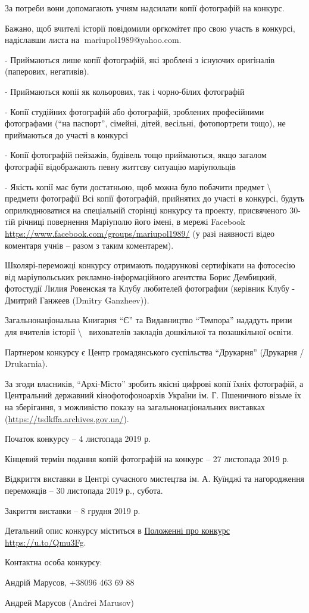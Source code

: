 За потреби вони допомагають учням надсилати копії фотографій на конкурс.

Бажано, щоб вчителі історії повідомили оргкомітет про свою участь в конкурсі,
надіславши листа на 📧mariupol1989@yahoo.com.

- Приймаються лише копії фотографій, які зроблені з існуючих оригіналів (паперових, негативів).

- Приймаються копії як кольорових, так і чорно-білих фотографій

- Копії студійних фотографій або фотографій, зроблених професійними фотографами
(\enquote{на паспорт}, сімейні, дітей, весільні, фотопортрети тощо), не приймаються до
участі в конкурсі

- Копії фотографій пейзажів, будівель тощо приймаються, якщо загалом фотографії відображають певну життєву ситуацію маріупольців

- Якість копії має бути достатньою, щоб можна було побачити предмет \textbackslash~ предмети
фотографії Всі копії фотографій, прийнятих до участі в конкурсі, будуть
оприлюднюватися на спеціальній сторінці конкурсу та проекту, присвяченого
30-тій річниці повернення Маріуполю його імені, в мережі Facebook
\url{https://www.facebook.com/groups/mariupol1989/} (у разі наявності відео коментаря
учнів – разом з таким коментарем).

Школярі-переможці конкурсу отримають подарункові сертифікати на фотосесію від
маріупольських рекламно-інформаційного агентства Борис Дембицкий, фотостудії
Лилия Ровенская та Клубу любителей фотографии (керівник Клубу - Дмитрий Ганжеев
(Dmitry Ganzheev)).

Загальнонаціональна Книгарня \enquote{Є} та Видавництво \enquote{Темпора} нададуть призи для
вчителів історії \textbackslash~ вихователів закладів дошкільної та позашкільної освіти. 

Партнером конкурсу є Центр громадянського суспільства \enquote{Друкарня} (Друкарня / Drukarnia).

За згоди власників, \enquote{Архі-Місто} зробить якісні цифрові копії їхніх фотографій,
а Центральний державний кінофотофоноархів України ім. Г. Пшеничного візьме їх на
зберігання, з можливістю показу на загальнонаціональних виставках
(\url{https://tsdkffa.archives.gov.ua/}).

Початок конкурсу – 4 листопада 2019 р.

Кінцевий термін подання копій фотографій на конкурс – 27 листопада 2019 р.

Відкриття виставки в Центрі сучасного мистецтва ім. А. Куїнджі та нагородження переможців – 30 листопада 2019 р., субота.

Закриття виставки – 8 грудня 2019 р.

Детальний опис конкурсу міститься в
\href{https://archive.org/details/mariupol1989_competition_statute_final}{Положенні
про конкурс} \url{https://u.to/Qmu3Fg}. 

Контактна особа конкурсу:

Андрій Марусов, +38096 463 69 88

Андрей Марусов (Andrei Marusov)
